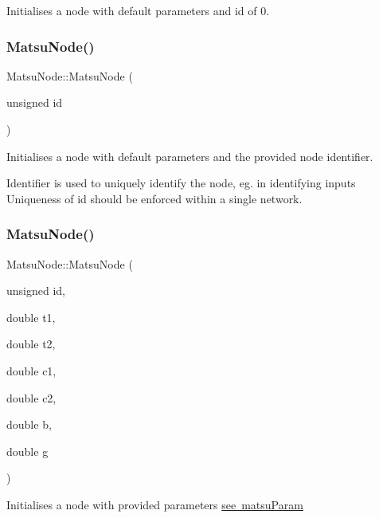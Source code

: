Initialises a node with default parameters and id of 0. 

\mbox{\label{classMatsuNode_a0c502c97d26d0e87831e70814d7f1576}} 
\subsubsection{\texorpdfstring{Matsu\+Node()}{MatsuNode()}\hspace{0.1cm}{\footnotesize\ttfamily [2/4]}}
{\footnotesize\ttfamily Matsu\+Node\+::\+Matsu\+Node (\begin{DoxyParamCaption}\item[{unsigned}]{id }\end{DoxyParamCaption})}



Initialises a node with default parameters and the provided node identifier. 

Identifier is used to uniquely identify the node, eg. in identifying inputs Uniqueness of id should be enforced within a single network. \mbox{\label{classMatsuNode_a424409287edb672d04f85a6b842f1a07}} 
\subsubsection{\texorpdfstring{Matsu\+Node()}{MatsuNode()}\hspace{0.1cm}{\footnotesize\ttfamily [3/4]}}
{\footnotesize\ttfamily Matsu\+Node\+::\+Matsu\+Node (\begin{DoxyParamCaption}\item[{unsigned}]{id,  }\item[{double}]{t1,  }\item[{double}]{t2,  }\item[{double}]{c1,  }\item[{double}]{c2,  }\item[{double}]{b,  }\item[{double}]{g }\end{DoxyParamCaption})}

Initialises a node with provided parameters \mbox{\hyperlink{classMatsuNode_aed801e1d0363292efc99bb02f1911386}{see matsu\+Param}} \mbox{\label{classMatsuNode_aef8572f9660b43e67d1c3fe83693eb96}} 
